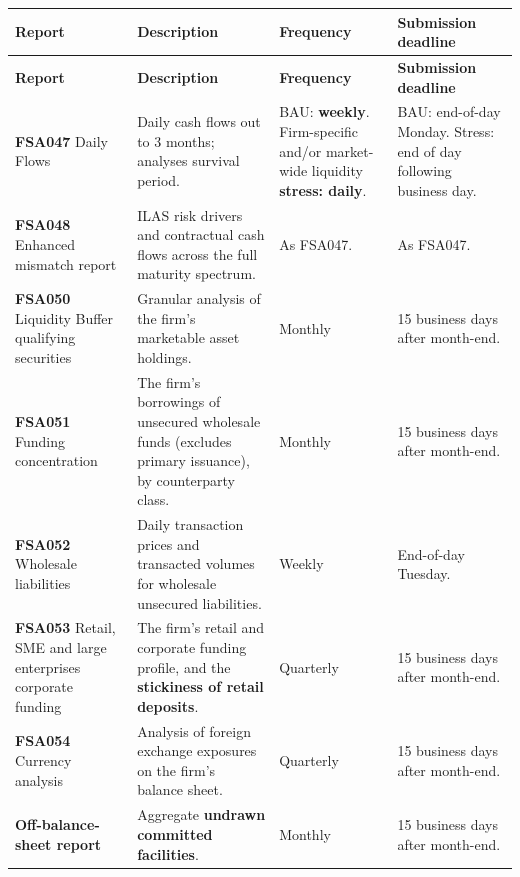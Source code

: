 \begin{center}
\scriptsize
\begin{longtable}{@{}p{3.2cm} p{5.1cm} p{2.6cm} p{3.3cm}@{}}
\toprule
\rowcolor{FRMSoft}\textbf{Report} & \textbf{Description} & \textbf{Frequency} & \textbf{Submission deadline} \\
\midrule
\endfirsthead
\toprule
\rowcolor{FRMSoft}\textbf{Report} & \textbf{Description} & \textbf{Frequency} & \textbf{Submission deadline} \\
\midrule
\endhead
\textbf{FSA047} \newline Daily Flows &
Daily cash flows out to 3 months; analyses survival period. &
BAU: \textbf{weekly}. \newline Firm-specific and/or market-wide liquidity \textbf{stress: daily}. &
BAU: end-of-day Monday. Stress: end of day following business day. \\
\addlinespace
\textbf{FSA048} \newline Enhanced mismatch report &
ILAS risk drivers and contractual cash flows across the full maturity spectrum. &
As FSA047. & As FSA047. \\
\addlinespace
\textbf{FSA050} \newline Liquidity Buffer qualifying securities &
Granular analysis of the firm's marketable asset holdings. &
Monthly & 15 business days after month-end. \\
\addlinespace
\textbf{FSA051} \newline Funding concentration &
The firm's borrowings of unsecured wholesale funds (excludes primary issuance), by counterparty class. &
Monthly & 15 business days after month-end. \\
\addlinespace
\textbf{FSA052} \newline Wholesale liabilities &
Daily transaction prices and transacted volumes for wholesale unsecured liabilities. &
Weekly & End-of-day Tuesday. \\
\addlinespace
\textbf{FSA053} \newline Retail, SME and large enterprises corporate funding &
The firm's retail and corporate funding profile, and the \textbf{stickiness of retail deposits}. &
Quarterly & 15 business days after month-end. \\
\addlinespace
\textbf{FSA054} \newline Currency analysis &
Analysis of foreign exchange exposures on the firm's balance sheet. &
Quarterly & 15 business days after month-end. \\
\addlinespace
\textbf{Off-balance-sheet report} &
Aggregate \textbf{undrawn committed facilities}. &
Monthly & 15 business days after month-end. \\
\bottomrule
\end{longtable}
\end{center}

